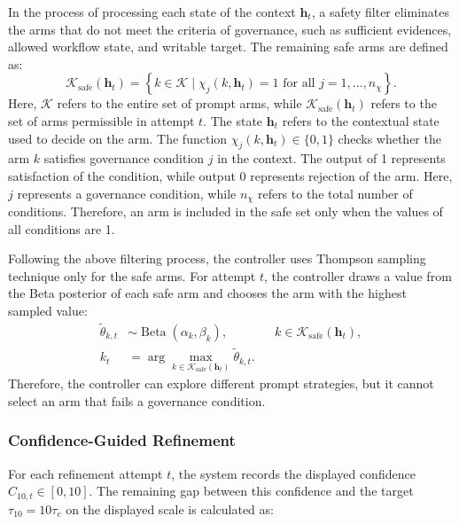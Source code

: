 \documentclass[manuscript,review]{acmart}
\begin{document}
In the process of processing each state of the context $\mathbf{h}_t$, a safety filter eliminates the arms that do not meet the criteria of governance, such as sufficient evidences, allowed workflow state, and writable target. The remaining safe arms are defined as:
\begin{equation}
\mathcal{K}_{\mathrm{safe}}(\mathbf{h}_t)
=
\left\{k\in\mathcal{K}\mid
\chi_j(k,\mathbf{h}_t)=1
\text{ for all }j=1,\ldots,n_{\chi}\right\}.
\end{equation}
Here, $\mathcal{K}$ refers to the entire set of prompt arms, while $\mathcal{K}_{\mathrm{safe}}(\mathbf{h}_t)$ refers to the set of arms permissible in attempt $t$. The state $\mathbf{h}_t$ refers to the contextual state used to decide on the arm. The function $\chi_j(k,\mathbf{h}_t)\in\{0,1\}$ checks whether the arm $k$ satisfies governance condition $j$ in the context. The output of 1 represents satisfaction of the condition, while output 0 represents rejection of the arm. Here, $j$ represents a governance condition, while $n_{\chi}$ refers to the total number of conditions. Therefore, an arm is included in the safe set only when the values of all conditions are 1.

Following the above filtering process, the controller uses Thompson sampling technique only for the safe arms. For attempt $t$, the controller draws a value from the Beta posterior of each safe arm and chooses the arm with the highest sampled value:
\begin{equation}
\begin{aligned}
\widetilde{\theta}_{k,t}
&\sim \operatorname{Beta}(\alpha_k,\beta_k),
&& k\in\mathcal{K}_{\mathrm{safe}}(\mathbf{h}_t),\\
k_t
&=\arg\max_{k\in\mathcal{K}_{\mathrm{safe}}(\mathbf{h}_t)}
\widetilde{\theta}_{k,t}.
\end{aligned}
\end{equation}
Therefore, the controller can explore different prompt strategies, but it cannot select an arm that fails a governance condition.

\subsubsection{Confidence-Guided Refinement}

For each refinement attempt $t$, the system records the displayed confidence
$C_{10,t}\in[0,10]$. The remaining gap between this confidence and the target
$\tau_{10}=10\tau_c$ on the displayed scale is calculated as:
\end{document}
